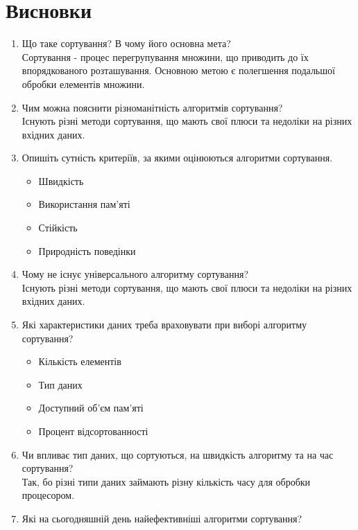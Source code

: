 \section{Висновки}
\label{sec:summary}

\begin{enumerate}
    \item Що таке сортування? В чому його основна мета? \\
          Сортування - процес перегрупування множини, що приводить до їх впорядкованого розташування.
          Основною метою є полегшення подальшої обробки елементів множини.
    \item Чим можна пояснити різноманітність алгоритмів сортування? \\
          Існують різні методи сортування, що мають свої плюси та недоліки на різних
          вхідних даних.
    \item Опишіть сутність критеріїв, за якими оцінюються алгоритми сортування.
          \begin{itemize}
              \item Швидкість
              \item Використання пам'яті
              \item Стійкість
              \item Природність поведінки
          \end{itemize}
    \item Чому не існує універсального алгоритму сортування? \\
          Існують різні методи сортування, що мають свої плюси та недоліки на різних
          вхідних даних.
    \item Які характеристики даних треба враховувати при виборі алгоритму сортування?
          \begin{itemize}
              \item Кількість елементів
              \item Тип даних
              \item Доступний об'єм пам'яті
              \item Процент відсортованності
          \end{itemize}
    \item Чи впливає тип даних, що сортуються, на швидкість алгоритму та на час сортування? \\
          Так, бо різні типи даних займають різну кількість часу для обробки процесором.
    \item Які на сьогодняшній день найефективніші алгоритми сортування?

\end{enumerate}
